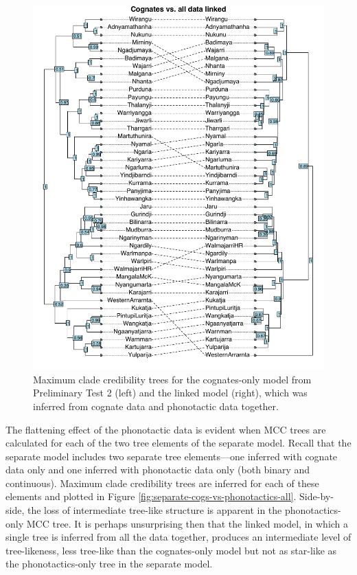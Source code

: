 \begin{figure}
\centering
\includegraphics{06-tree-inference/fig/cogs_vs_linked_all.pdf}
\caption[Maximum clade credibility trees for the cognates-only model (from Preliminary Test 2) and the linked model]{\label{fig:cogs-vs-linked-all}Maximum clade credibility trees for the cognates-only model from Preliminary Test 2 (left) and the linked model (right), which was inferred from cognate data and phonotactic data together.}
\end{figure}

The flattening effect of the phonotactic data is evident when MCC trees are calculated for each of the two tree elements of the separate model. Recall that the separate model includes two separate tree elements---one inferred with cognate data only and one inferred with phonotactic data only (both binary and continuous). Maximum clade credibility trees are inferred for each of these elements and plotted in Figure \ref{fig:separate-cogs-vs-phonotactics-all}. Side-by-side, the loss of intermediate tree-like structure is apparent in the phonotactics-only MCC tree. It is perhaps unsurprising then that the linked model, in which a single tree is inferred from all the data together, produces an intermediate level of tree-likeness, less tree-like than the cognates-only model but not as star-like as the phonotactics-only tree in the separate model.

